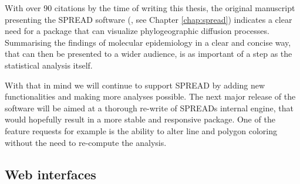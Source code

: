 
With over 90 citations by the time of writing this thesis, the original manuscript presenting the SPREAD software (\citet{Bielejec2011}, see Chapter \ref{chap:spread}) indicates a clear need for a package that can visualize phylogeographic diffusion processes.
Summarising the findings of molecular epidemiology in a clear and concise way, that can then be presented to a wider audience, is as important of a step as the statistical analysis itself.

With that in mind we will continue to support SPREAD by adding new functionalities and making more analyses possible.
The next major release of the software will be aimed at a thorough re-write of SPREADs internal engine, that would hopefully result in a more stable and responsive package.
One of the feature requests for example is the ability to alter line and polygon coloring without the need to re-compute the analysis.

\subsection{Web interfaces}

